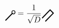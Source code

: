 \documentclass[a4paper,twocolumn,11pt,accepted=2024-02-08]{quantumarticle}
\theoremstyle{break}
\newcommand{\1}{\mathbbm{1}}
\theoremstyle{plain}
\theoremstyle{plain}
\theoremstyle{plain}
\newcommand{\MYcircle}[2]{
\draw[thick, fill=white] (#1,#2) circle (0.1cm); }
\begin{document}
\begin{equation}
    \begin{tikzpicture}[baseline=(current  bounding  box.center), scale=0.7]
    \MYcircle{0.25}{0.25}
    \draw[very thick] (-0.25,-0.25)--(0.20,0.20);
    \end{tikzpicture}
    =\frac{1}{\sqrt{D}}
    \begin{tikzpicture}[baseline=(current  bounding  box.center), scale=0.7]
    \draw[very thick] (-0.25,-0.25)--(0.25,0.25)--(0.05,0.45)--(-0.45,-0.05);
    \end{tikzpicture}
\end{equation}
\end{document}
